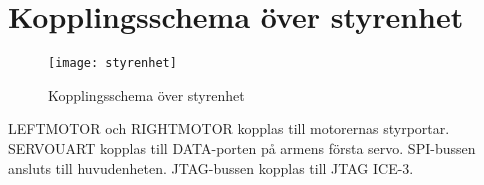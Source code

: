 \section{Kopplingsschema över styrenhet}

\begin{figure}[h]
\center
\texttt{[image: styrenhet]}
\caption{Kopplingsschema över styrenhet}
\end{figure}

LEFTMOTOR och RIGHTMOTOR kopplas till motorernas styrportar. SERVOUART kopplas till DATA-porten på armens första servo. SPI-bussen ansluts till huvudenheten. JTAG-bussen kopplas till JTAG ICE-3.
